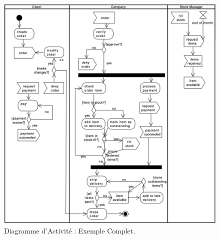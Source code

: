 \begin{figure}[H]
	\includegraphics[width=\textwidth]{./Images/Diagrammes/diagram_activite_ex_complet.png}
	\caption{Diagramme d'Activit\'e : Exemple Complet.}
	\label{fig:diagram_activite_ex_complet}
\end{figure}


\newpage

